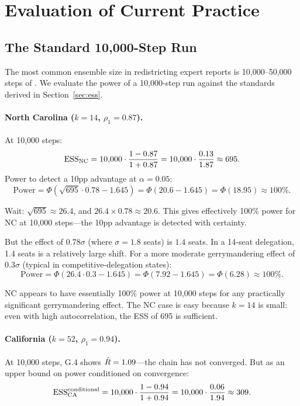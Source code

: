 \section{Evaluation of Current Practice}
\label{sec:current}

\subsection{The Standard 10,000-Step Run}

The most common ensemble size in redistricting expert reports is 10,000--50,000
steps of \recom{}.
We evaluate the power of a 10,000-step run against the standards
derived in Section~\ref{sec:ess}.

\paragraph{North Carolina ($k = 14$, $\rho_1 = 0.87$).}
At 10,000 steps:
\[
  \mathrm{ESS}_{\rm NC} = 10{,}000 \cdot \frac{1 - 0.87}{1 + 0.87} = 10{,}000 \cdot
  \frac{0.13}{1.87} \approx 695.
\]
Power to detect a 10pp advantage at $\alpha = 0.05$:
\[
  \text{Power} = \Phi\!\left(\sqrt{695} \cdot 0.78 - 1.645\right)
  = \Phi(20.6 - 1.645) = \Phi(18.95) \approx 100\%.
\]

Wait: $\sqrt{695} \approx 26.4$, and $26.4 \times 0.78 \approx 20.6$.
This gives effectively 100\% power for NC at 10,000 steps---the 10pp
advantage is detected with certainty.

But the effect of $0.78\sigma$ (where $\sigma = 1.8$ seats) is $1.4$ seats.
In a 14-seat delegation, 1.4 seats is a relatively large shift.
For a more moderate gerrymandering effect of $0.3\sigma$ (typical in
competitive-delegation states):
\[
  \text{Power} = \Phi\!\left(26.4 \cdot 0.3 - 1.645\right)
  = \Phi(7.92 - 1.645) = \Phi(6.28) \approx 100\%.
\]

NC appears to have essentially 100\% power at 10,000 steps for any
practically significant gerrymandering effect.
The NC case is easy because $k = 14$ is small: even with high autocorrelation,
the ESS of 695 is sufficient.

\paragraph{California ($k = 52$, $\rho_1 = 0.94$).}
At 10,000 steps, G.4 shows $\hat{R} = 1.09$---the chain has not converged.
But as an upper bound on power conditioned on convergence:
\[
  \mathrm{ESS}_{\rm CA}^{\rm conditional} = 10{,}000 \cdot \frac{1 - 0.94}{1 + 0.94}
  = 10{,}000 \cdot \frac{0.06}{1.94} \approx 309.
\]

